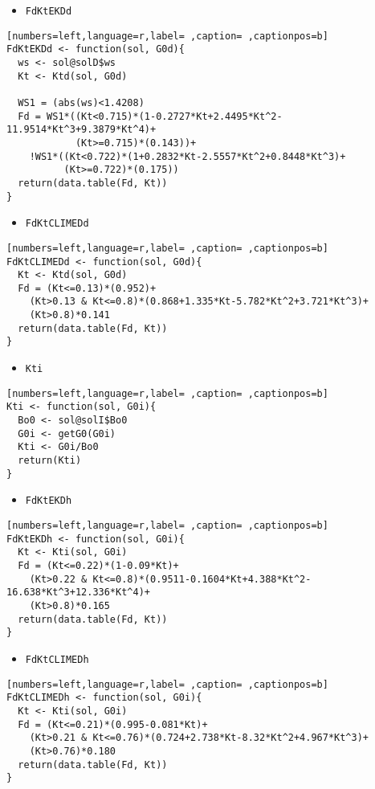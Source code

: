 \begin{itemize}
\item \texttt{FdKtEKDd}
\end{itemize}
\begin{lstlisting}[numbers=left,language=r,label= ,caption= ,captionpos=b]
FdKtEKDd <- function(sol, G0d){
  ws <- sol@solD$ws
  Kt <- Ktd(sol, G0d)

  WS1 = (abs(ws)<1.4208)
  Fd = WS1*((Kt<0.715)*(1-0.2727*Kt+2.4495*Kt^2-11.9514*Kt^3+9.3879*Kt^4)+
            (Kt>=0.715)*(0.143))+
    !WS1*((Kt<0.722)*(1+0.2832*Kt-2.5557*Kt^2+0.8448*Kt^3)+
          (Kt>=0.722)*(0.175))
  return(data.table(Fd, Kt))
}
\end{lstlisting}
\begin{itemize}
\item \texttt{FdKtCLIMEDd}
\end{itemize}
\begin{lstlisting}[numbers=left,language=r,label= ,caption= ,captionpos=b]
FdKtCLIMEDd <- function(sol, G0d){
  Kt <- Ktd(sol, G0d)
  Fd = (Kt<=0.13)*(0.952)+
    (Kt>0.13 & Kt<=0.8)*(0.868+1.335*Kt-5.782*Kt^2+3.721*Kt^3)+
    (Kt>0.8)*0.141
  return(data.table(Fd, Kt))
}
\end{lstlisting}
\begin{itemize}
\item \texttt{Kti}
\end{itemize}
\begin{lstlisting}[numbers=left,language=r,label= ,caption= ,captionpos=b]
Kti <- function(sol, G0i){
  Bo0 <- sol@solI$Bo0
  G0i <- getG0(G0i)
  Kti <- G0i/Bo0
  return(Kti)
}
\end{lstlisting}
\begin{itemize}
\item \texttt{FdKtEKDh}
\end{itemize}
\begin{lstlisting}[numbers=left,language=r,label= ,caption= ,captionpos=b]
FdKtEKDh <- function(sol, G0i){
  Kt <- Kti(sol, G0i)
  Fd = (Kt<=0.22)*(1-0.09*Kt)+
    (Kt>0.22 & Kt<=0.8)*(0.9511-0.1604*Kt+4.388*Kt^2-16.638*Kt^3+12.336*Kt^4)+
    (Kt>0.8)*0.165
  return(data.table(Fd, Kt))
}
\end{lstlisting}
\begin{itemize}
\item \texttt{FdKtCLIMEDh}
\end{itemize}
\begin{lstlisting}[numbers=left,language=r,label= ,caption= ,captionpos=b]
FdKtCLIMEDh <- function(sol, G0i){
  Kt <- Kti(sol, G0i)
  Fd = (Kt<=0.21)*(0.995-0.081*Kt)+
    (Kt>0.21 & Kt<=0.76)*(0.724+2.738*Kt-8.32*Kt^2+4.967*Kt^3)+
    (Kt>0.76)*0.180
  return(data.table(Fd, Kt))
}
\end{lstlisting}
